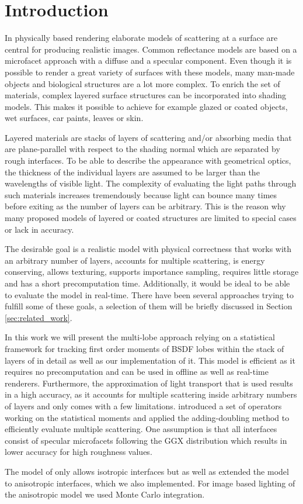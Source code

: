 \section{Introduction}
\label{sec:introduction}

In physically based rendering elaborate models of scattering at a surface are central for producing realistic images. Common reflectance models are based on a microfacet approach with a diffuse and a specular component. Even though it is possible to render a great variety of surfaces with these models, many man-made objects and biological structures are a lot more complex. To enrich the set of materials, complex layered surface structures can be incorporated into shading models. This makes it possible to achieve for example glazed or coated objects, wet surfaces, car paints, leaves or skin.

%

Layered materials are stacks of layers of scattering and/or absorbing media that are plane-parallel with respect to the shading normal which are separated by rough interfaces. To be able to describe the appearance with geometrical optics, the thickness of the individual layers are assumed to be larger than the wavelengths of visible light. The complexity of evaluating the light paths through such materials increases tremendously because light can bounce many times before exiting as the number of layers can be arbitrary. This is the reason why many proposed models of layered or coated structures are limited to special cases or lack in accuracy.

%

The desirable goal is a realistic model with physical correctness that works with an arbitrary number of layers, accounts for multiple scattering, is energy conserving, allows texturing, supports importance sampling, requires little storage and has a short precomputation time. Additionally, it would be ideal to be able to evaluate the model in real-time. There have been several approaches trying to fulfill some of these goals, a selection of them will be briefly discussed in Section \ref{sec:related_work}.

%

In this work we will present the multi-lobe approach relying on a statistical framework for tracking first order moments of BSDF lobes within the stack of layers of \textcite{belcour2018} in detail as well as our implementation of it. This model is efficient as it requires no precomputation and can be used in offline as well as real-time renderers. Furthermore, the approximation of light transport that is used results in a high accuracy, as it accounts for multiple scattering inside arbitrary numbers of layers and only comes with a few limitations. \textcite{belcour2018} introduced a set of operators working on the statistical moments and applied the adding-doubling method to efficiently evaluate multiple scattering. One assumption is that all interfaces consist of specular microfacets following the GGX distribution which results in lower accuracy for high roughness values.

%

The model of \textcite{belcour2018} only allows isotropic interfaces but \textcite{yamaguchi2019} as well as \textcite{weier2020} extended the model to anisotropic interfaces, which we also implemented. For image based lighting of the anisotropic model we used Monte Carlo integration.